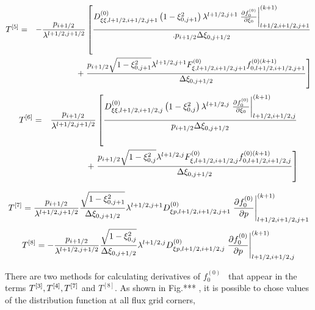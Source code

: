 \begin{eqnarray}
T^{\left[ 5\right] } &=&-\frac{p_{i+1/2}}{\lambda ^{l+1/2,j+1/2}}\left[ 
\frac{D_{\xi \xi ,l+1/2,i+1/2,j+1}^{\left( 0\right) }\left( 1-\xi
_{0,j+1}^{2}\right) \lambda ^{l+1/2,j+1}\left. \frac{\partial f_{0}^{\left(
0\right) }}{\partial \xi _{0}}\right\vert _{l+1/2,i+1/2,j+1}^{(k+1)}}{%
.p_{i+1/2}\Delta \xi _{0,j+1/2}}\right.  \notag \\
&&+\left. \frac{p_{i+1/2}\sqrt{1-\xi _{0,j+1}^{2}}\lambda ^{l+1/2,j+1}F_{\xi
,l+1/2,i+1/2,j+1}^{\left( 0\right) }f_{0,l+1/2,i+1/2,j+1}^{\left( 0\right)
(k+1)}}{\Delta \xi _{0,j+1/2}}\right]
\end{eqnarray}%
\begin{eqnarray}
T^{\left[ 6\right] } &=&\frac{p_{i+1/2}}{\lambda ^{l+1/2,j+1/2}}\left[ \frac{%
D_{\xi \xi ,l+1/2,i+1/2,j}^{\left( 0\right) }\left( 1-\xi _{0,j}^{2}\right)
\lambda ^{l+1/2,j}\left. \frac{\partial f_{0}^{\left( 0\right) }}{\partial
\xi _{0}}\right\vert _{l+1/2,i+1/2,j}^{(k+1)}}{p_{i+1/2}\Delta \xi _{0,j+1/2}%
}\right.  \notag \\
&&+\left. \frac{p_{i+1/2}\sqrt{1-\xi _{0,j}^{2}}\lambda ^{l+1/2,j}F_{\xi
,l+1/2,i+1/2,j}^{\left( 0\right) }f_{0,l+1/2,i+1/2,j}^{\left( 0\right) (k+1)}%
}{\Delta \xi _{0,j+1/2}}\right]
\end{eqnarray}

\begin{equation}
T^{\left[ 7\right] }=\frac{p_{i+1/2}}{\lambda ^{l+1/2,j+1/2}}\frac{\sqrt{%
1-\xi _{0,j+1}^{2}}}{\Delta \xi _{0,j+1/2}}\lambda ^{l+1/2,j+1}D_{\xi
p,l+1/2,i+1/2,j+1}^{\left( 0\right) }\left. \frac{\partial f_{0}^{\left(
0\right) }}{\partial p}\right| _{l+1/2,i+1/2,j+1}^{(k+1)}
\end{equation}
\begin{equation}
T^{\left[ 8\right] }=-\frac{p_{i+1/2}}{\lambda ^{l+1/2,j+1/2}}\frac{\sqrt{%
1-\xi _{0,j}^{2}}}{\Delta \xi _{0,j+1/2}}\lambda ^{l+1/2,j}D_{\xi
p,l+1/2,i+1/2,j}^{\left( 0\right) }\left. \frac{\partial f_{0}^{\left(
0\right) }}{\partial p}\right| _{l+1/2,i+1/2,j}^{(k+1)}
\end{equation}

There are two methods for calculating derivatives of $f_{0}^{\left( 0\right)
}$ \ that appear in the terms $T^{\left[ 3\right] },T^{\left[ 4\right] },T^{%
\left[ 7\right] }$ and $T^{\left[ 8\right] }.$ As shown in Fig.*** , it is
possible to chose values of the distribution function at all flux grid
corners,

